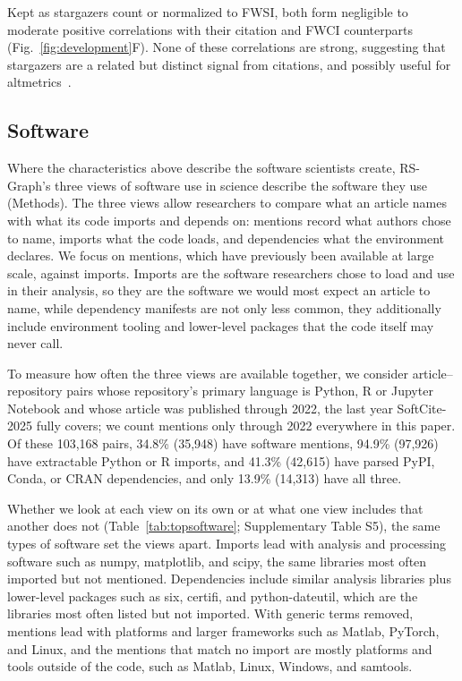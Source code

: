\documentclass[pdflatex,sn-nature]{sn-jnl}%
\begin{document}
Kept as stargazers count or normalized to FWSI, both form negligible to moderate positive correlations with their citation and FWCI counterparts (Fig.~\ref{fig:development}F). None of these correlations are strong, suggesting that stargazers are a related but distinct signal from citations, and possibly useful for altmetrics~\cite{priem2011altmetrics}.

\subsection{Software}\label{subsec:software}

Where the characteristics above describe the software scientists create, RS-Graph's three views of software use in science describe the software they use (Methods). The three views allow researchers to compare what an article names with what its code imports and depends on: mentions record what authors chose to name, imports what the code loads, and dependencies what the environment declares. We focus on mentions, which have previously been available at large scale, against imports. Imports are the software researchers chose to load and use in their analysis, so they are the software we would most expect an article to name, while dependency manifests are not only less common, they additionally include environment tooling and lower-level packages that the code itself may never call.

To measure how often the three views are available together, we consider article--repository pairs whose repository's primary language is Python, R or Jupyter Notebook and whose article was published through 2022, the last year SoftCite-2025 fully covers; we count mentions only through 2022 everywhere in this paper. Of these 103,168 pairs, 34.8\% (35,948) have software mentions, 94.9\% (97,926) have extractable Python or R imports, and 41.3\% (42,615) have parsed PyPI, Conda, or CRAN dependencies, and only 13.9\% (14,313) have all three.

Whether we look at each view on its own or at what one view includes that another does not (Table~\ref{tab:topsoftware}; Supplementary Table S5), the same types of software set the views apart. Imports lead with analysis and processing software such as numpy, matplotlib, and scipy, the same libraries most often imported but not mentioned. Dependencies include similar analysis libraries plus lower-level packages such as six, certifi, and python-dateutil, which are the libraries most often listed but not imported. With generic terms removed, mentions lead with platforms and larger frameworks such as Matlab, PyTorch, and Linux, and the mentions that match no import are mostly platforms and tools outside of the code, such as Matlab, Linux, Windows, and samtools.
\end{document}
